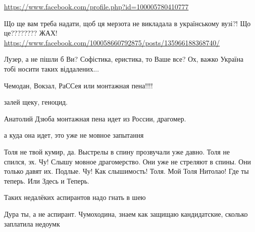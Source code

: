 \begin{itemize}
\url{https://www.facebook.com/profile.php?id=100005780410777}

Що ще вам треба надати, щоб ця мерзота не викладала в українському вузі?!
Що це????????
ЖАХ!
\url{https://www.facebook.com/100058660792875/posts/135966188368740/}


Лузер, а не пішли б Ви? Софістика, еристика, то Ваше все? Ох, важко Україна тобі носити таких віддалених...


Чемодан, Вокзал, РаССея или монтажная пена!!!!


залей щеку, геноцид.


Анатолий Дзюба монтажная пена идет из России, драгомер.


а куда она идет, это уже не мовное запытання


Толя не твой кумир, да. Выстрелы в спину прозвучали уже давно. Толя не спился,
эх. Чу! Слышу мовное драгомерство. Они уже не стреляют в спины. Они только
давят их. Подлые. Чу! Как слышимость! Толя. Мой Толя Нитолао! Где ты теперь.
Или Здесь и Теперь.


Таких недалёких аспирантов надо гнать в шею


Дура ты, а не аспирант. Чумоходина, знаем как защищаю кандидатские, сколько
заплатила недоумк

\end{itemize}
